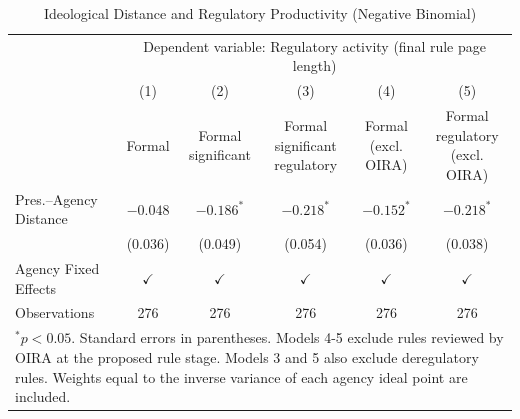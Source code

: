 \begin{table}[H]
\centering
\caption{Ideological Distance and Regulatory Productivity (Negative Binomial)}
\label{tab:t2repacs}
\small
\begin{tabular}{lccccc}
\hline\hline
 & \multicolumn{5}{c}{Dependent variable: Regulatory activity (final rule page length)} \\
\cline{2-6}
 & (1) & (2) & (3) & (4) & (5) \\
 & Formal & \makecell[c]{Formal\\significant} & \makecell[c]{Formal significant\\regulatory} & \makecell[c]{Formal\\(excl. OIRA)} & \makecell[c]{Formal regulatory\\(excl. OIRA)} \\
\hline
Pres.--Agency Distance & $-0.048$ & $-0.186^{*}$ & $-0.218^{*}$ & $-0.152^{*}$ & $-0.218^{*}$ \\
 & (0.036) & (0.049) & (0.054) & (0.036) & (0.038) \\
\hline
Agency Fixed Effects & $\checkmark$ & $\checkmark$ & $\checkmark$ & $\checkmark$ & $\checkmark$ \\
Observations & 276 & 276 & 276 & 276 & 276 \\
\hline
\multicolumn{6}{l}{\parbox{0.95\textwidth}{$^{*}p < 0.05$. Standard errors in parentheses. Models 4-5 exclude rules reviewed by OIRA at the proposed rule stage. Models 3 and 5 also exclude deregulatory rules. Weights equal to the inverse variance of each agency ideal point are included.}} \\
\hline\hline
\end{tabular}
\end{table}
